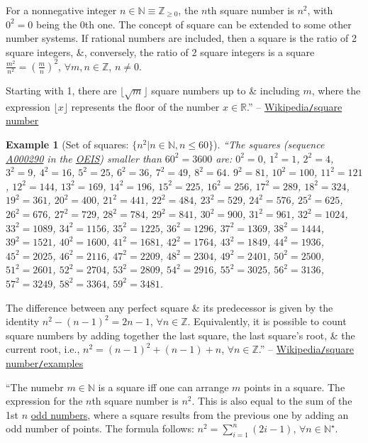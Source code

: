 \documentclass{article}
\newtheorem{example}{Example}
\begin{document}
For a nonnegative integer $n\in\mathbb{N}\equiv\mathbb{Z}_{\ge0}$, the $n$th square number is $n^2$, with $0^2 = 0$ being the 0th one. The concept of square can be extended to some other number systems. If rational numbers are included, then a square is the ratio of 2 square integers, \&, conversely, the ratio of 2 square integers is a square $\frac{m^2}{n^2} = \left(\frac{m}{n}\right)^2$, $\forall m,n\in\mathbb{Z}$, $n\ne0$.

Starting with 1, there are $\lfloor\sqrt{m}\rfloor$ square numbers up to \& including $m$, where the expression $\lfloor x\rfloor$ represents the floor of the number $x\in\mathbb{R}$.'' -- \href{https://en.wikipedia.org/wiki/Square_number}{Wikipedia{\tt /}square number}

\begin{example}[Set of squares: $\{n^2|n\in\mathbb{N},n\le60\}$]
	``The squares (sequence \href{https://oeis.org/A000290}{A000290} in the \href{https://en.wikipedia.org/wiki/On-Line_Encyclopedia_of_Integer_Sequences}{OEIS}) smaller than $60^2 = 3600$ are: $0^2 = 0$, $1^2 = 1$, $2^2 = 4$, $3^2 = 9$, $4^2 = 16$, $5^2 = 25$, $6^2 = 36$, $7^2 = 49$, $8^2 = 64$. $9^2 = 81$, $10^2 = 100$, $11^2 = 121$, $12^2 = 144$, $13^2 = 169$, $14^2 = 196$, $15^2 = 225$, $16^2 = 256$, $17^2 = 289$, $18^2 = 324$, $19^2 = 361$, $20^2 = 400$, $21^2 = 441$, $22^2 = 484$, $23^2 = 529$, $24^2 = 576$, $25^2 = 625$, $26^2 =  676$, $27^2 = 729$, $28^2 = 784$, $29^2 = 841$, $30^2 = 900$, $31^2 = 961$, $32^2 = 1024$, $33^2 = 1089$, $34^2 = 1156$, $35^2 = 1225$, $36^2 = 1296$, $37^2 = 1369$, $38^2 = 1444$, $39^2 = 1521$, $40^2 = 1600$, $41^2 = 1681$, $42^2 = 1764$, $43^2 = 1849$, $44^2 = 1936$, $45^2 = 2025$, $46^2 = 2116$, $47^2 = 2209$, $48^2 = 2304$, $49^2 = 2401$, $50^2 = 2500$, $51^2 = 2601$, $52^2 = 2704$, $53^2 = 2809$, $54^2 = 2916$, $55^2 = 3025$, $56^2 = 3136$, $57^2 = 3249$, $58^2 = 3364$, $59^2 = 3481$.
\end{example}
The difference between any perfect square \& its predecessor is given by the identity $n^2 - (n - 1)^2 = 2n - 1$, $\forall n\in\mathbb{Z}$. Equivalently, it is possible to count square numbers by adding together the last square, the last square's root, \& the current root, i.e., $n^2 = (n - 1)^2 + (n - 1) + n$, $\forall n\in\mathbb{Z}$.'' -- \href{https://en.wikipedia.org/wiki/Square_number#Examples}{Wikipedia{\tt /}square number{\tt /}examples}

``The numebr $m\in\mathbb{N}$ is a square iff one can arrange $m$ points in a square. The expression for the $n$th square number is $n^2$. This is also equal to the sum of the 1st $n$ \href{https://en.wikipedia.org/wiki/Parity_(mathematics)}{odd numbers}, where a square results from the previous one by adding an odd number of points. The formula follows: $n^2 = \sum_{i=1}^n (2i - 1)$, $\forall n\in\mathbb{N}^\star$.
\end{document}
